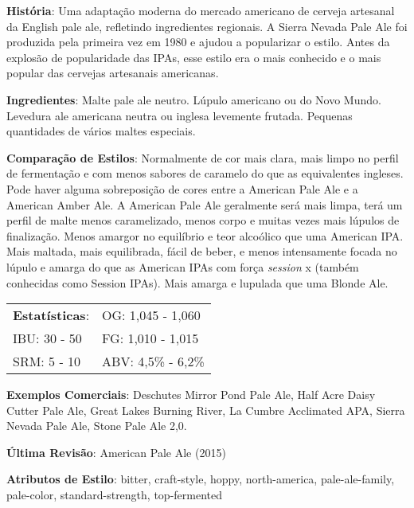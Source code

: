 \textbf{História}: Uma adaptação moderna do mercado americano de cerveja artesanal da English pale ale, refletindo ingredientes regionais. A Sierra Nevada Pale Ale foi produzida pela primeira vez em 1980 e ajudou a popularizar o estilo. Antes da explosão de popularidade das IPAs, esse estilo era o mais conhecido e o mais popular das cervejas artesanais americanas.

\textbf{Ingredientes}: Malte pale ale neutro. Lúpulo americano ou do Novo Mundo. Levedura ale americana neutra ou inglesa levemente frutada. Pequenas quantidades de vários maltes especiais.

\textbf{Comparação de Estilos}: Normalmente de cor mais clara, mais limpo no perfil de fermentação e com menos sabores de caramelo do que as equivalentes ingleses. Pode haver alguma sobreposição de cores entre a American Pale Ale e a American Amber Ale. A American Pale Ale geralmente será mais limpa, terá um perfil de malte menos caramelizado, menos corpo e muitas vezes mais lúpulos de finalização. Menos amargor no equilíbrio e teor alcoólico que uma American IPA. Mais maltada, mais equilibrada, fácil de beber, e menos intensamente focada no lúpulo e amarga do que as American IPAs com força \textit{session} x (também conhecidas como Session IPAs). Mais amarga e lupulada que uma Blonde Ale.

\begin{tabular}{@{}p{35mm}p{35mm}@{}}
  \textbf{Estatísticas}: & OG: 1,045 - 1,060 \\
  IBU: 30 - 50  & FG: 1,010 - 1,015  \\
  SRM: 5 - 10  & ABV: 4,5\% - 6,2\%
\end{tabular}

\textbf{Exemplos Comerciais}: Deschutes Mirror Pond Pale Ale, Half Acre Daisy Cutter Pale Ale, Great Lakes Burning River, La Cumbre Acclimated APA, Sierra Nevada Pale Ale, Stone Pale Ale 2,0.

\textbf{Última Revisão}: American Pale Ale (2015)

\textbf{Atributos de Estilo}: bitter, craft-style, hoppy, north-america, pale-ale-family, pale-color, standard-strength, top-fermented
